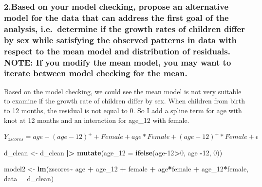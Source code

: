 \documentclass[
]{article}
\newenvironment{Shaded}{\begin{snugshade}}{\end{snugshade}}
\newcommand{\AttributeTok}[1]{\textcolor[rgb]{0.13,0.29,0.53}{#1}}
\newcommand{\DecValTok}[1]{\textcolor[rgb]{0.00,0.00,0.81}{#1}}
\newcommand{\FunctionTok}[1]{\textcolor[rgb]{0.13,0.29,0.53}{\textbf{#1}}}
\newcommand{\NormalTok}[1]{#1}
\newcommand{\OtherTok}[1]{\textcolor[rgb]{0.56,0.35,0.01}{#1}}
\newcommand{\SpecialCharTok}[1]{\textcolor[rgb]{0.81,0.36,0.00}{\textbf{#1}}}
\begin{document}
\hypertarget{based-on-your-model-checking-propose-an-alternative-model-for-the-data-that-can-address-the-first-goal-of-the-analysis-i.e.-determine-if-the-growth-rates-of-children-differ-by-sex-while-satisfying-the-observed-patterns-in-data-with-respect-to-the-mean-model-and-distribution-of-residuals.-note-if-you-modify-the-mean-model-you-may-want-to-iterate-between-model-checking-for-the-mean.}{%
\subsubsection{2.Based on your model checking, propose an alternative
model for the data that can address the first goal of the analysis,
i.e.~determine if the growth rates of children differ by sex while
satisfying the observed patterns in data with respect to the mean model
and distribution of residuals. NOTE: If you modify the mean model, you
may want to iterate between model checking for the
mean.}\label{based-on-your-model-checking-propose-an-alternative-model-for-the-data-that-can-address-the-first-goal-of-the-analysis-i.e.-determine-if-the-growth-rates-of-children-differ-by-sex-while-satisfying-the-observed-patterns-in-data-with-respect-to-the-mean-model-and-distribution-of-residuals.-note-if-you-modify-the-mean-model-you-may-want-to-iterate-between-model-checking-for-the-mean.}}

Based on the model checking, we could see the mean model is not very
suitable to examine if the growth rate of children differ by sex. When
children from birth to 12 months, the residual is not equal to 0. So I
add a spline term for age with knot at 12 months and an interaction for
age\_12 with female.

\(Y_{zscores} = age + (age-12)^+ + Female + age * Female + (age-12)^+ * Female + \epsilon\)

\begin{Shaded}
\begin{Highlighting}[]
\NormalTok{d\_clean }\OtherTok{\textless{}{-}}\NormalTok{ d\_clean }\SpecialCharTok{|\textgreater{}}
  \FunctionTok{mutate}\NormalTok{(}\AttributeTok{age\_12 =} \FunctionTok{ifelse}\NormalTok{(age}\DecValTok{{-}12}\SpecialCharTok{\textgreater{}}\DecValTok{0}\NormalTok{, age }\SpecialCharTok{{-}}\DecValTok{12}\NormalTok{, }\DecValTok{0}\NormalTok{))}

\NormalTok{model2 }\OtherTok{\textless{}{-}} \FunctionTok{lm}\NormalTok{(zscores}\SpecialCharTok{\textasciitilde{}}\NormalTok{ age }\SpecialCharTok{+}\NormalTok{ age\_12 }\SpecialCharTok{+}\NormalTok{ female }\SpecialCharTok{+}\NormalTok{ age}\SpecialCharTok{*}\NormalTok{female }\SpecialCharTok{+}\NormalTok{ age\_12}\SpecialCharTok{*}\NormalTok{female, }\AttributeTok{data =}\NormalTok{ d\_clean)}
\end{Highlighting}
\end{Shaded}
\end{document}
